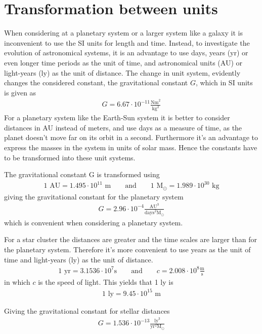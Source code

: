 \section{Transformation between units}
\label{sec:Conversion}
When considering at a planetary system or a larger system like a galaxy it is inconvenient to use the SI units for length and time.
Instead, to investigate the evolution of astronomical systems, it is an advantage to use days, years (yr) or even longer time periods as the unit of time, and astronomical units (AU) or light-years (ly) as the unit of distance.
The change in unit system, evidently changes the considered constant, the gravitational constant $G$, which in SI units is given as
\begin{align*}
	G = 6.67\cdot 10^{-11} \frac{\textrm{Nm}^2}{\textrm{kg}^2}
\end{align*}
For a planetary system like the Earth-Sun system it is better to consider distances in AU instead of meters, and use days as a measure of time, as the planet doesn't move far on its orbit in a second.
Furthermore it's an advantage to express the masses in the system in units of solar mass. 
Hence the constants have to be transformed into these unit systems. 

The gravitational constant G is transformed using
\begin{align*}
	1 \textrm{ AU} = 1.495\cdot10^{11} \textrm{ m}
	\qquad \text{and} \qquad
	1 \textrm{ M}_{\odot} = 1.989 \cdot 10^{30} \textrm{ kg}
\end{align*}
giving the gravitational constant for the planetary system
\begin{align*}
	G = 2.96\cdot 10^{-4} \frac{\textrm{AU}^3}{\textrm{days}^2 \textrm{M}_{\odot}}
\end{align*}
which is convenient when considering a planetary system.
 
For a star cluster the distances are greater and the time scales are larger than for the planetary system.
Therefore it's more convenient to use years as the unit of time and light-years (ly) as the unit of distance. 
\begin{align*}
	1 \textrm{ yr} = 3.1536\cdot10^7\textrm{s}
	\qquad \text{and} \qquad
	c = 2.008\cdot 10^8 \frac{\textrm{m}}{\textrm{s}}
\end{align*}
in which $c$ is the speed of light.
This yields that 1 ly is
\begin{align*}
	1 \textrm{ ly} = 9.45 \cdot 10^{15} \textrm{ m}
\end{align*}

Giving the gravitational constant for stellar distances 
\begin{align*}
	G = 1.536\cdot 10^{-13} \frac{\textrm{ly}^3}{\textrm{yr}^2 {\textrm{M}}_{\odot}}
\end{align*}




